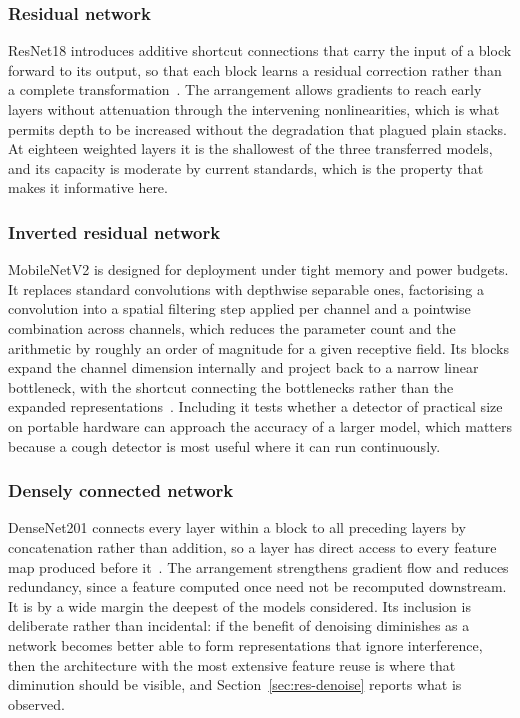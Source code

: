 \subsubsection{Residual network}\label{sec:d-resnet}

ResNet18 introduces additive shortcut connections that carry the input of a
block forward to its output, so that each block learns a residual correction
rather than a complete transformation~\cite{he2016}. The arrangement allows
gradients to reach early layers without attenuation through the intervening
nonlinearities, which is what permits depth to be increased without the
degradation that plagued plain stacks. At eighteen weighted layers it is the
shallowest of the three transferred models, and its capacity is moderate by
current standards, which is the property that makes it informative here.

\subsubsection{Inverted residual network}\label{sec:d-mobilenet}

MobileNetV2 is designed for deployment under tight memory and power budgets.
It replaces standard convolutions with depthwise separable ones, factorising a
convolution into a spatial filtering step applied per channel and a pointwise
combination across channels, which reduces the parameter count and the
arithmetic by roughly an order of magnitude for a given receptive field. Its
blocks expand the channel dimension internally and project back to a narrow
linear bottleneck, with the shortcut connecting the bottlenecks rather than the
expanded representations~\cite{sandler2018}. Including it tests whether a
detector of practical size on portable hardware can approach the accuracy of a
larger model, which matters because a cough detector is most useful where it
can run continuously.

\subsubsection{Densely connected network}\label{sec:d-densenet}

DenseNet201 connects every layer within a block to all preceding layers by
concatenation rather than addition, so a layer has direct access to every
feature map produced before it~\cite{huang2017}. The arrangement strengthens
gradient flow and reduces redundancy, since a feature computed once need not
be recomputed downstream. It is by a wide margin the deepest of the models
considered. Its inclusion is deliberate rather than incidental: if the benefit
of denoising diminishes as a network becomes better able to form
representations that ignore interference, then the architecture with the most
extensive feature reuse is where that diminution should be visible, and
Section~\ref{sec:res-denoise} reports what is observed.

